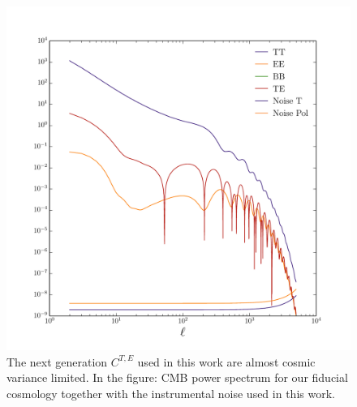\documentclass[aps,prd,preprint,groupedaddress]{revtex4-1}
\begin{document}
\begin{figure}[htbp]
\begin{center}
\includegraphics[scale=0.6]{PS_with_noise.pdf}
\caption{The next generation $C^{T,E}$ used in this work are almost cosmic variance limited.
In the figure: CMB power spectrum for our fiducial cosmology together with the instrumental noise used in this work.}
\label{fig:cmb-cl-noise}
\end{center}
\end{figure}
\end{document}
